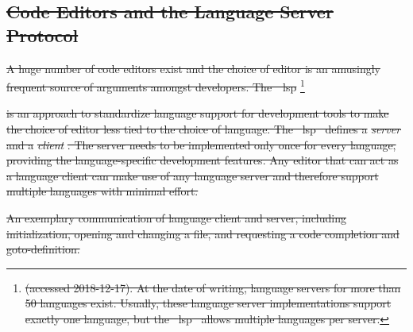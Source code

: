 \documentclass[sigplan,10pt,review,anonymous]{acmart}
\providecommand{\DIFdel}[1]{{\protect\color{red}\sout{#1}}}                      %
\providecommand{\DIFdelFL}[1]{\DIFdel{#1}} %
\begin{document}
\subsection[]{\DIFdel{Code Editors and the Language Server Protocol}}
\addtocounter{subsection}{-1}%

\DIFdel{A huge number of code editors exist and the choice of editor is an amusingly
frequent source of arguments amongst
developers. The~\mbox{%
\acf{lsp}}\hspace{0pt}%
}\footnote{%
\DIFdel{(accessed 2018-12-17). At the date of writing, language servers for more than
  50 languages exist. Usually, these language server implementations support
  exactly one language, but the \mbox{%
\ac{lsp} }\hspace{0pt}%
allows multiple languages per server.}}
\addtocounter{footnote}{-1}%
\DIFdel{is an approach to standardize language support for development tools to make the
choice of editor less tied to the choice of language. The \mbox{%
\ac{lsp} }\hspace{0pt}%
defines a
}\emph{\DIFdel{server}} %
\DIFdel{and a }\emph{\DIFdel{client}}%
\DIFdel{. The server needs to be implemented only once
for every language, providing the language-specific development features. Any
editor that can act as a language client can make use of any language
server and
therefore support multiple languages with minimal effort.
}%


{%
\DIFdelFL{An exemplary communication of language client and server, including initialization, opening and changing a file, and requesting a code completion and goto-definition.}}
\end{document}
